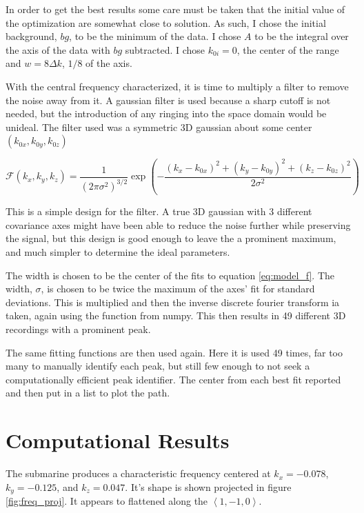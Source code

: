 \documentclass{article}
\begin{document}
    
    In order to get the best results some care must be taken that the initial value of the optimization are somewhat close to solution. As such, I chose the initial background, $bg$, to be the minimum of the data. I chose $A$ to be the integral over the axis of the data with $bg$ subtracted. I chose $k_{0i}=0$, the center of the range and $w=8 \Delta k$, $1/8$ of the axis.

    With the central frequency characterized, it is time to multiply a filter to remove the noise away from it. A gaussian filter is used because a sharp cutoff is not needed, but the introduction of any ringing into the space domain would be unideal. The filter used was a symmetric 3D gaussian about some center $(k_{0x}, k_{0y}, k_{0z})$

    \begin{equation}
        \mathcal{F}(k_x, k_y, k_z) = \frac{1}{(2 \pi \sigma^2)^{3/2}} \exp \left( -\frac{(k_x - k_{0x})^2 + (k_y - k_{0y})^2 + (k_z - k_{0z})^2}{2 \sigma^2} \right)
    \end{equation}

    This is a simple design for the filter. A true 3D gaussian with 3 different covariance axes might have been able to reduce the noise further while preserving the signal, but this design is good enough to leave the a prominent maximum, and much simpler to determine the ideal parameters.

    The width is chosen to be the center of the fits to equation \ref{eq:model_f}. The width, $\sigma$, is chosen to be twice the maximum of the axes' fit for standard deviations. This is multiplied and then the inverse discrete fourier transform ia taken, again using the function from numpy. This then results in 49 different 3D recordings with a prominent peak.

    The same fitting functions are then used again. Here it is used 49 times, far too many to manually identify each peak, but still few enough to not seek a computationally efficient peak identifier. The center from each best fit reported and then put in a list to plot the path.

    \section{Computational Results}
    The submarine produces a characteristic frequency centered at $k_x=-0.078$, $k_y=-0.125$, and $k_z = 0.047$. It's shape is shown projected in figure \ref{fig:freq_proj}. It appears to flattened along the $\left< 1, -1, 0 \right>$.
\end{document}
